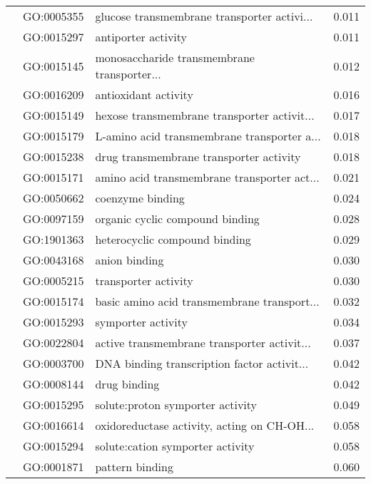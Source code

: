 \begin{longtable}{lllr}
   & GO:0005355 &  glucose transmembrane transporter activi... &         0.011 \\
   & GO:0015297 &                          antiporter activity &         0.011 \\
   & GO:0015145 &  monosaccharide transmembrane transporter... &         0.012 \\
   & GO:0016209 &                         antioxidant activity &         0.016 \\
   & GO:0015149 &  hexose transmembrane transporter activit... &         0.017 \\
   & GO:0015179 &  L-amino acid transmembrane transporter a... &         0.018 \\
   & GO:0015238 &      drug transmembrane transporter activity &         0.018 \\
   & GO:0015171 &  amino acid transmembrane transporter act... &         0.021 \\
   & GO:0050662 &                             coenzyme binding &         0.024 \\
   & GO:0097159 &              organic cyclic compound binding &         0.028 \\
   & GO:1901363 &                heterocyclic compound binding &         0.029 \\
   & GO:0043168 &                                anion binding &         0.030 \\
   & GO:0005215 &                         transporter activity &         0.030 \\
   & GO:0015174 &  basic amino acid transmembrane transport... &         0.032 \\
   & GO:0015293 &                           symporter activity &         0.034 \\
   & GO:0022804 &  active transmembrane transporter activit... &         0.037 \\
   & GO:0003700 &  DNA binding transcription factor activit... &         0.042 \\
   & GO:0008144 &                                 drug binding &         0.042 \\
   & GO:0015295 &             solute:proton symporter activity &         0.049 \\
   & GO:0016614 &  oxidoreductase activity, acting on CH-OH... &         0.058 \\
   & GO:0015294 &             solute:cation symporter activity &         0.058 \\
   & GO:0001871 &                              pattern binding &         0.060 \\

\end{longtable}
